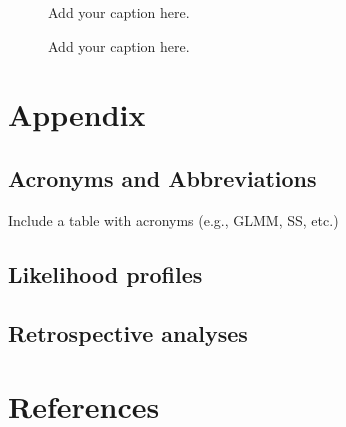 \documentclass[
]{scrartcl}
\begin{document}
\newpage{}

\begin{figure}


\caption{\label{fig-comp-catch}Add your caption here.}

\end{figure}%

\newpage{}

\begin{figure}


\caption{\label{fig-comp-cpue}Add your caption here.}

\end{figure}%

\newpage{}

\section{Appendix}\label{appendix}

\subsection{Acronyms and
Abbreviations}\label{acronyms-and-abbreviations}

Include a table with acronyms (e.g., GLMM, SS, etc.)

\subsection{Likelihood profiles}\label{likelihood-profiles}

\subsection{Retrospective analyses}\label{retrospective-analyses}

\newpage{}

\section*{References}\label{references}
\end{document}
